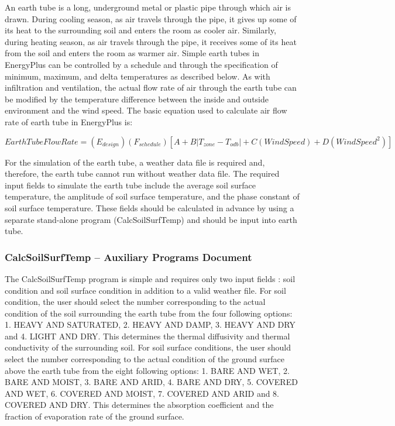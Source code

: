 An earth tube is a long, underground metal or plastic pipe through which air is drawn. During cooling season, as air travels through the pipe, it gives up some of its heat to the surrounding soil and enters the room as cooler air. Similarly, during heating season, as air travels through the pipe, it receives some of its heat from the soil and enters the room as warmer air. Simple earth tubes in EnergyPlus can be controlled by a schedule and through the specification of minimum, maximum, and delta temperatures as described below. As with infiltration and ventilation, the actual flow rate of air through the earth tube can be modified by the temperature difference between the inside and outside environment and the wind speed. The basic equation used to calculate air flow rate of earth tube in EnergyPlus is:

\begin{equation}
EarthTubeFlowRate = \left( {{E_{design}}} \right)\left( {{F_{schedule}}} \right)\left[ {A + B\left| {{T_{zone}} - {T_{odb}}} \right| + C\left( {WindSpeed} \right) + D\left( {WindSpee{d^2}} \right)} \right]
\end{equation}

For the simulation of the earth tube, a weather data file is required and, therefore, the earth tube cannot run without weather data file. The required input fields to simulate the earth tube include the average soil surface temperature, the amplitude of soil surface temperature, and the phase constant of soil surface temperature. These fields should be calculated in advance by using a separate stand-alone program (CalcSoilSurfTemp) and should be input into earth tube.

\subsubsection{CalcSoilSurfTemp -- Auxiliary Programs Document}\label{calcsoilsurftemp-auxiliary-programs-document}

The CalcSoilSurfTemp program is simple and requires only two input fields : soil condition and soil surface condition in addition to a valid weather file. For soil condition, the user should select the number corresponding to the actual condition of the soil surrounding the earth tube from the four following options: 1. HEAVY AND SATURATED, 2. HEAVY AND DAMP, 3. HEAVY AND DRY and 4. LIGHT AND DRY. This determines the thermal diffusivity and thermal conductivity of the surrounding soil. For soil surface conditions, the user should select the number corresponding to the actual condition of the ground surface above the earth tube from the eight following options: 1. BARE AND WET, 2. BARE AND MOIST, 3. BARE AND ARID, 4. BARE AND DRY, 5. COVERED AND WET, 6. COVERED AND MOIST, 7. COVERED AND ARID and 8. COVERED AND DRY. This determines the absorption coefficient and the fraction of evaporation rate of the ground surface.

